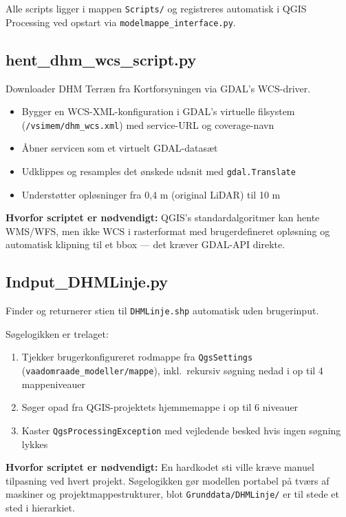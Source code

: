 Alle scripts ligger i mappen \texttt{Scripts/} og registreres automatisk i
QGIS Processing ved opstart via \texttt{modelmappe\_interface.py}.

\subsection{hent\_dhm\_wcs\_script.py}

Downloader DHM Terræn fra Kortforsyningen via GDAL's WCS-driver.

\begin{itemize}
  \item Bygger en WCS-XML-konfiguration i GDAL's virtuelle filsystem
        (\texttt{/vsimem/dhm\_wcs.xml}) med service-URL og coverage-navn
  \item Åbner servicen som et virtuelt GDAL-datasæt
  \item Udklippes og resamples det ønskede udsnit med \texttt{gdal.Translate}
  \item Understøtter opløsninger fra 0,4 m (original LiDAR) til 10 m
\end{itemize}

\textbf{Hvorfor scriptet er nødvendigt:} QGIS's standardalgoritmer kan hente
WMS/WFS, men ikke WCS i rasterformat med brugerdefineret opløsning og automatisk
klipning til et bbox — det kræver GDAL-API direkte.

\subsection{Indput\_DHMLinje.py}
\label{sec:indput_dhmlinje}

Finder og returnerer stien til \texttt{DHMLinje.shp} automatisk uden brugerinput.

Søgelogikken er trelaget:
\begin{enumerate}
  \item Tjekker brugerkonfigureret rodmappe fra \texttt{QgsSettings}
        (\texttt{vaadomraade\_modeller/mappe}), inkl.\ rekursiv søgning nedad
        i op til 4 mappeniveauer
  \item Søger opad fra QGIS-projektets hjemmemappe i op til 6 niveauer
  \item Kaster \texttt{QgsProcessingException} med vejledende besked hvis
        ingen søgning lykkes
\end{enumerate}

\textbf{Hvorfor scriptet er nødvendigt:} En hardkodet sti ville kræve manuel
tilpasning ved hvert projekt. Søgelogikken gør modellen portabel på tværs af
maskiner og projektmappestrukturer, blot \texttt{Grunddata/DHMLinje/} er til
stede et sted i hierarkiet.

